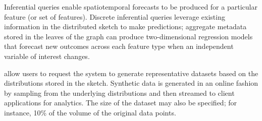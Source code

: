 \begin{description}[leftmargin=*]

\item[Inferential Queries]
    Inferential queries enable spatiotemporal forecasts to be produced for a particular feature (or set of features). Discrete inferential queries leverage existing information in the distributed sketch to make predictions; aggregate metadata stored in the leaves of the graph can produce two-dimensional regression models that forecast new outcomes across each feature type when an independent variable of interest changes.\vspace{-0.6em}


\item[Synthetic Data Queries] allow users to request the system to generate representative datasets based on the distributions stored in the sketch. Synthetic data is generated in an online fashion by sampling from the underlying distributions and then streamed to client applications for analytics. The size of the dataset may also be specified; for instance, 10\% of the volume of the original data points.
\end{description}


